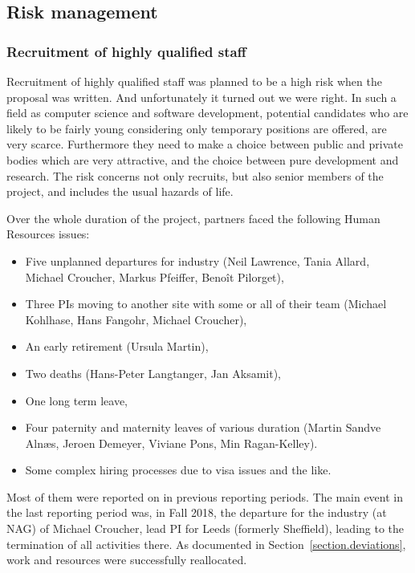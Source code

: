 \subsection{Risk management}
\label{section.risk_management}
\subsubsection{Recruitment of highly qualified staff}

Recruitment of highly qualified staff was planned to be a high risk
when the proposal was written. And unfortunately it turned out we were
right. In such a field as computer science and software development,
potential candidates who are likely to be fairly young considering
only temporary positions are offered, are very scarce. Furthermore
they need to make a choice between public and private bodies which are
very attractive, and the choice between pure development and research.
The risk concerns not only recruits, but also senior members of the
project, and includes the usual hazards of life.

Over the whole duration of the project, \ODK partners faced the
following Human Resources issues:
\begin{itemize}
\item Five unplanned departures for industry (Neil Lawrence, Tania
  Allard, Michael Croucher, Markus Pfeiffer, Benoît Pilorget),
\item Three PIs moving to another site with some or all of their team
  (Michael Kohlhase, Hans Fangohr, Michael Croucher),
\item An early retirement (Ursula Martin),
\item Two deaths (Hans-Peter Langtanger, Jan Aksamit),
\item One long term leave,
\item Four paternity and maternity leaves of various duration (Martin
  Sandve Alnæs, Jeroen Demeyer, Viviane Pons, Min Ragan-Kelley).
\item Some complex hiring processes due to visa issues and the like.
\end{itemize}

Most of them were reported on in previous reporting periods. The main
event in the last reporting period was, in Fall 2018, the departure
for the industry (at NAG) of Michael Croucher, lead PI for Leeds
(formerly Sheffield), leading to the termination of all activities
there. As documented in Section~\ref{section.deviations}, work and
resources were successfully reallocated.

